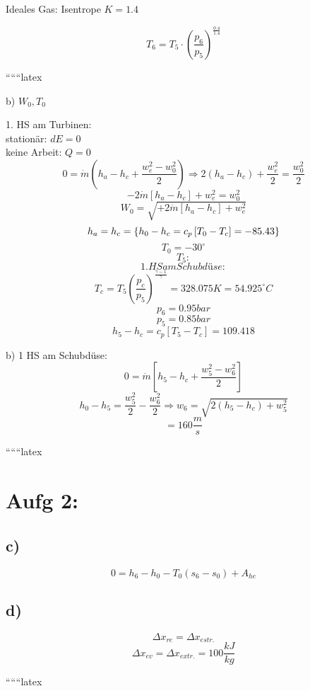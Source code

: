 \noindent Ideales Gas: Isentrope $K = 1.4$

\[
T_6 = T_5 \cdot \left( \frac{p_6}{p_5} \right)^{\frac{0.4}{1.4}}
\]

``````latex

b) $W_0, T_0$

1. HS am Turbinen: \\
stationär: $dE = 0$ \\
keine Arbeit: $Q = 0$ \\
\[
0 = \dot{m} \left( h_a - h_c + \frac{w_e^2 - w_0^2}{2} \right) \Rightarrow 2(h_a - h_c) + \frac{w_e^2}{2} = \frac{w_0^2}{2}
\]
\[
-2 \dot{m} \left[ h_a - h_c \right] + w_e^2 = w_0^2
\]
\[
W_0 = \sqrt{+2 \dot{m} \left[ h_a - h_c \right] + w_e^2}
\]
\[
h_a = \\
h_c = \left\{ h_0 - h_c = c_p \left[ T_0 - T_c \right] = -85.43 \right\}
\]
\[
T_0 = -30^\circ
\]
\[
T_5:
\]
\[
1. HS am Schubdüse:
\]
\[
T_c = T_5 \left( \frac{p_c}{p_5} \right)^{\frac{\gamma - 1}{\gamma}} = 328.075 K = 54.925^\circ C
\]
\[
p_6 = 0.95 bar
\]
\[
p_5 = 0.85 bar
\]
\[
h_5 - h_c = c_p \left[ T_5 - T_c \right] = 109.418
\]

b) 1 HS am Schubdüse:
\[
0 = \dot{m} \left[ h_5 - h_c + \frac{w_5^2 - w_6^2}{2} \right]
\]
\[
h_0 - h_5 = \frac{w_5^2}{2} - \frac{w_6^2}{2} \Rightarrow w_6 = \sqrt{2(h_5 - h_c) + w_5^2}
\]
\[
= 160 \frac{m}{s}
\]

``````latex


\section*{Aufg 2:}

\subsection*{c)}
\[
0 = h_6 - h_0 - T_0 (s_6 - s_0) + A_{he}
\]

\subsection*{d)}
\[
\Delta x_{re} = \Delta x_{estr.}
\]
\[
\Delta x_{ev} = \Delta x_{extr.} = 100 \frac{kJ}{kg}
\]

``````latex


